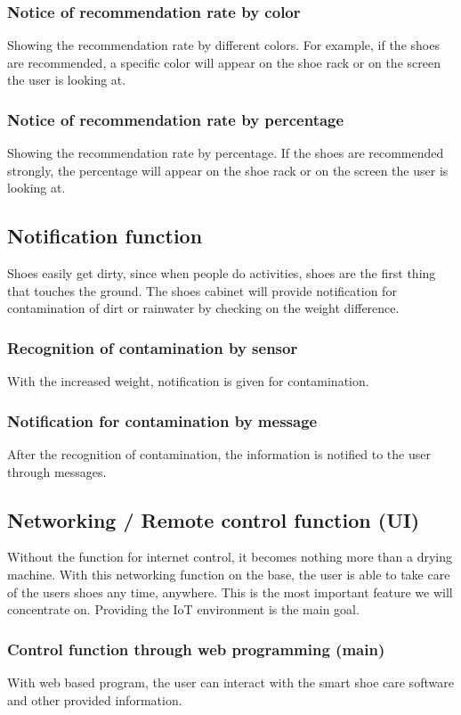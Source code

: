 \documentclass[conference]{IEEEtran}
\begin{document}
\subsubsection{ Notice of recommendation rate by color}
Showing the recommendation rate by different colors. For example, if the shoes are recommended, a specific color will appear on the shoe rack or on the screen the user is looking at. 
\subsubsection{Notice of recommendation rate by percentage}
Showing the recommendation rate by percentage. If the shoes are recommended strongly, the percentage will appear on the shoe rack or on the screen the user is looking at. \\


\subsection{Notification function}
Shoes easily get dirty, since when people do activities, shoes are the first thing that touches the ground. The shoes cabinet will provide notification for contamination of dirt or rainwater by checking on the weight difference.
\subsubsection{Recognition of contamination by sensor}
With the increased weight, notification is given for contamination.
\subsubsection{Notification for contamination by message}
After the recognition of contamination, the information is notified to the user through messages.\\


\subsection{Networking / Remote control function (UI)}
Without the function for internet control, it becomes nothing more than a drying machine. With this networking function on the base, the user is able to take care of the users shoes any time, anywhere. This is the most important feature we will concentrate on. Providing the IoT environment is the main goal. 
\subsubsection{Control function through web programming (main)}
With web based program, the user can interact with the smart shoe care software and other provided information.
\end{document}
